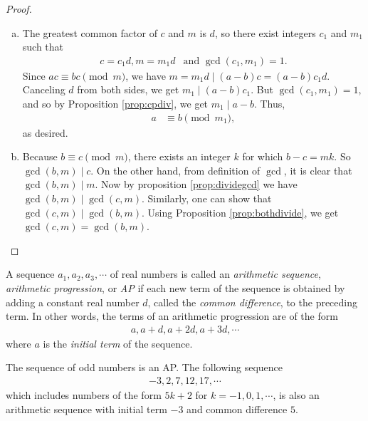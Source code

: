 \documentclass{subfile}
\begin{document}
	\begin{proof}
		$ $
		\begin{enumerate}[(a)]
			\item The greatest common factor of $c$ and $m$ is $d$, so  there exist integers $c_1$ and $m_1$ such that
				\begin{align*}
				 	c=c_1d, m = m_1 d & \mbox{and } \gcd(c_1,m_1) = 1.
				\end{align*}
			Since $ac \equiv bc \pmod m$, we have $m=m_1d\mid (a-b)c=(a-b)c_1d$. Canceling $d$ from both sides, we get $m_1\mid (a-b)c_1$. But $\gcd(c_1,m_1)=1$, and so by Proposition \ref{prop:cpdiv}, we get $m_1\mid a-b$. Thus,
				\begin{align*} 
					a 
						& \equiv b \pmod{m_1},
				\end{align*}
			as desired.
			
			\item Because $b \equiv c \pmod m$, there exists an integer $k$ for which $b-c=mk$. So $\gcd(b,m)\mid c$. On the other hand, from definition of $\gcd$, it is clear that $\gcd(b,m)\mid m$. Now by proposition \ref{prop:dividegcd} we have $\gcd(b,m)\mid \gcd(c,m)$. Similarly, one can show that $\gcd(c,m)\mid \gcd(b,m)$. Using Proposition \ref{prop:bothdivide}, we get $\gcd(c,m)=\gcd(b,m)$. 
		\end{enumerate}
	\end{proof}
	
	\begin{definition}\label{def:AP}
		A sequence $a_1, a_2, a_3, \cdots$ of real numbers is called an \textit{arithmetic sequence}, \textit{arithmetic progression}, or \textit{AP} if each new term of the sequence is obtained by adding a constant real number $d$, called the \textit{common difference}, to the preceding term. In other words, the terms of an arithmetic progression are of the form
			\begin{align*}
				a, a+d, a+2d, a+3d, \cdots
			\end{align*}
		where $a$ is the \textit{initial term} of the sequence.
	\end{definition}
	
	\begin{example}
		The sequence of odd numbers is an AP. The following sequence
			\begin{align*}
				-3, 2, 7, 12, 17, \cdots
			\end{align*}
		which includes numbers of the form $5k+2$ for $k=-1,0,1,\cdots$, is also an arithmetic sequence with initial term $-3$ and common difference $5$.
	\end{example}
	
\end{document}
